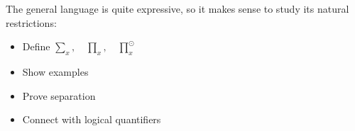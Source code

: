 The general language is quite expressive, so it makes sense to study its natural restrictions:
\begin{itemize}
\item Define $\sum_x, \quad \prod_x, \quad \prod_x^{\odot}$
\item Show examples
\item Prove separation
\item Connect with logical quantifiers
\end{itemize}